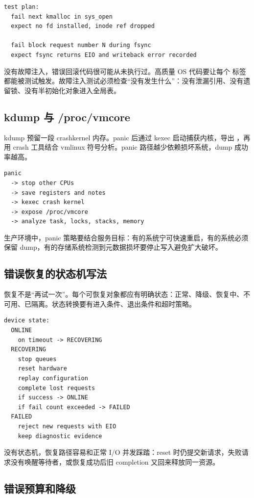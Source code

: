 \begin{lstlisting}
test plan:
  fail next kmalloc in sys_open
  expect no fd installed, inode ref dropped

  fail block request number N during fsync
  expect fsync returns EIO and writeback error recorded
\end{lstlisting}

没有故障注入，错误回滚代码很可能从未执行过。高质量 OS 代码要让每个  标签都能被测试触发。故障注入测试必须检查“没有发生什么”：没有泄漏引用、没有遗留锁、没有半初始化对象进入全局表。

\subsection{kdump 与 /proc/vmcore}

kdump 预留一段 crashkernel 内存。panic 后通过 kexec 启动捕获内核，导出 ，再用 crash 工具结合 vmlinux 符号分析。panic 路径越少依赖损坏系统，dump 成功率越高。

\begin{lstlisting}
panic
  -> stop other CPUs
  -> save registers and notes
  -> kexec crash kernel
  -> expose /proc/vmcore
  -> analyze task, locks, stacks, memory
\end{lstlisting}

生产环境中，panic 策略要结合服务目标：有的系统宁可快速重启，有的系统必须保留 dump，有的存储系统检测到元数据损坏要停止写入避免扩大破坏。

\subsection{错误恢复的状态机写法}

恢复不是“再试一次”。每个可恢复对象都应有明确状态：正常、降级、恢复中、不可用、已隔离。状态转换要有进入条件、退出条件和超时策略。

\begin{lstlisting}
device state:
  ONLINE
    on timeout -> RECOVERING
  RECOVERING
    stop queues
    reset hardware
    replay configuration
    complete lost requests
    if success -> ONLINE
    if fail count exceeded -> FAILED
  FAILED
    reject new requests with EIO
    keep diagnostic evidence
\end{lstlisting}

没有状态机，恢复路径容易和正常 I/O 并发踩踏：reset 时仍提交新请求，失败请求没有唤醒等待者，或恢复成功后旧 completion 又回来释放同一资源。

\subsection{错误预算和降级}

